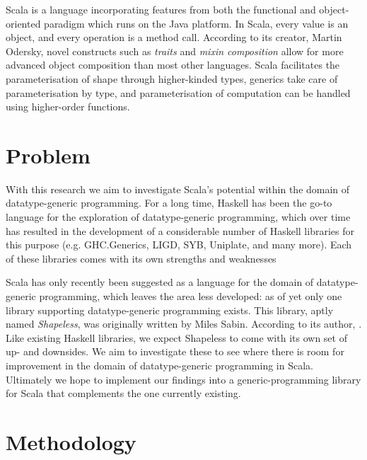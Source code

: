\documentclass[a4paper]{article}
\begin{document}
Scala\cite{odersky2004scala} is a language incorporating features from both the functional and object-oriented paradigm which runs on the Java platform. In Scala, every value is an object, and every operation is a method call. According to its creator, Martin Odersky, novel constructs such as \emph{traits} and \emph{mixin composition} allow for more advanced object composition than most other languages\cite{odersky2005scalable}. Scala facilitates the parameterisation of shape through higher-kinded types, generics take care of parameterisation by type, and parameterisation of computation can be handled using higher-order functions\cite{Oliveira08scalafor}. 

\section{Problem}

With this research we aim to investigate Scala's potential within the domain of datatype-generic programming. For a long time, Haskell has been the go-to language for the exploration of datatype-generic programming\cite{Oliveira08scalafor}, which over time has resulted in the development of a considerable number of Haskell libraries for this purpose (e.g. GHC.Generics, LIGD, SYB, Uniplate, and many more).  Each of these libraries comes with its own strengths and weaknesses

Scala has only recently been suggested as a language for the domain of datatype-generic programming\cite{Oliveira08scalafor}, which leaves the area less developed: as of yet only one library supporting datatype-generic programming exists. This library, aptly named \emph{Shapeless}\cite{shapeless}, was originally written by Miles Sabin. According to its author, . Like existing Haskell libraries, we expect Shapeless to come with its own set of up- and downsides. We aim to investigate these to see where there is room for improvement in the domain of datatype-generic programming in Scala. Ultimately we hope to implement our findings into a generic-programming library for Scala that complements the one currently existing.

\section{Methodology}
\end{document}
